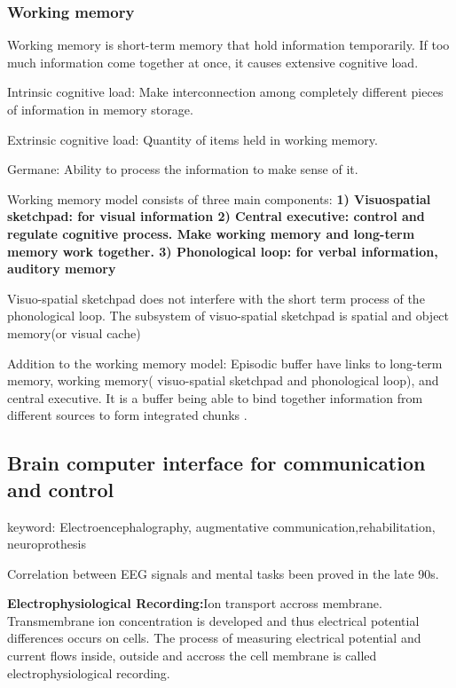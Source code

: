 \documentclass{article}
\begin{document}
\subsubsection{Working memory}
Working memory is short-term memory that hold information temporarily. If too much information come together at once, it causes extensive cognitive load.

Intrinsic cognitive load: Make interconnection among completely different pieces of information in memory storage.

Extrinsic cognitive load: Quantity of items held in working memory.

Germane: Ability to process the information to make sense of it.

Working memory model consists of three main components:
\textbf{1)	Visuospatial sketchpad: for visual information
2)	Central executive: control and regulate cognitive process. Make working memory and long-term memory work together.
3)	Phonological loop: for verbal information, auditory memory}

Visuo-spatial sketchpad does not interfere with the short term process of the phonological loop. The subsystem of visuo-spatial sketchpad is spatial and object memory(or visual cache)

Addition to the working memory model: Episodic buffer have links to long-term memory, working memory( visuo-spatial sketchpad and phonological loop), and central executive. It is a buffer being able to bind together information from different sources to form integrated chunks \cite{Baddeley_2011}.

\begin{comment}
\subsection{Brain-Computer Interface (BCI): Types, Processing Perspectives and Applications}

\cite{Panoulas_2010}
\end{comment}
\subsection{Brain computer interface for communication and control}
keyword:
Electroencephalography,
augmentative 
communication,rehabilitation, neuroprothesis

Correlation between EEG signals and mental tasks been proved in the late 90s.

\textbf{Electrophysiological Recording:}Ion transport accross membrane. Transmembrane ion concentration is developed and thus electrical potential differences occurs on cells. The process of measuring electrical potential and current flows inside, outside and accross the cell membrane is called electrophysiological recording. \par
\end{document}
